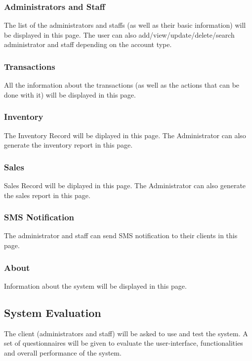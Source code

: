 \documentclass[journal]{./IEEE/IEEEtran}
\begin{document}
\subsubsection{Administrators and Staff}
The list of the administrators and staffs (as well as their basic information) will be displayed in this page. The user can also 	add/view/update/delete/search administrator and staff depending on the account type.

\subsubsection{Transactions}
All the information about the transactions (as well as the actions that can be done with it) will be displayed in this page.

\subsubsection{Inventory}
The Inventory Record will be diplayed in this page. The Administrator can also generate the inventory report in this page.

\subsubsection{Sales}
Sales Record will be diplayed in this page. The Administrator can also generate the sales report in this page.

\subsubsection{SMS Notification}
The administrator and staff can send SMS notification to their clients in this page.

\subsubsection{About}
Information about the system will be displayed in this page.

\subsection{System Evaluation}
The client (administrators and staff) will be asked to use and test the system. A set of questionnaires will be given to evaluate the user-interface, functionalities and overall performance of the system. 
\end{document}
